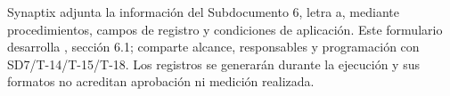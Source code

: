 \documentclass[11pt,letterpaper]{report}
\begin{document}
\tableofcontents\clearpage
{}
Synaptix adjunta la información del Subdocumento 6, letra a, mediante procedimientos, campos de registro y condiciones de aplicación. Este formulario desarrolla \ArchivoSDSeis, sección 6.1; comparte alcance, responsables y programación con SD7/T-14/T-15/T-18. Los registros se generarán durante la ejecución y sus formatos no acreditan aprobación ni medición realizada.\parencite[Formulario T-9, p.~61]{sd6-ba}

\CierreSubdocumento
\end{document}
